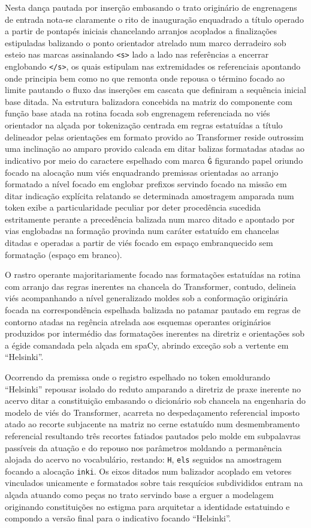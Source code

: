 \documentclass[
  brazilian,
]{article}
\begin{document}
Nesta dança pautada por inserção embasando o trato originário de
engrenagens de entrada nota-se claramente o rito de inauguração
enquadrado a título operado a partir de pontapés iniciais chancelando
arranjos acoplados a finalizações estipuladas balizando o ponto
orientador atrelado num marco derradeiro sob esteio nas marcas
assinalando \texttt{\textless{}s\textgreater{}} lado a lado nas
referências a encerrar englobando \texttt{\textless{}/s\textgreater{}},
os quais estipulam nas extremidades os referenciais apontando onde
principia bem como no que remonta onde repousa o término focado ao
limite pautando o fluxo das inserções em cascata que definiram a
sequência inicial base ditada. Na estrutura balizadora concebida na
matriz do componente com função base atada na rotina focada sob
engrenagem referenciada no viés orientador na alçada por tokenização
centrada em regras estatuídas a título delineador pelas orientações em
formato provido ao Transformer reside outrossim uma inclinação ao amparo
provido calcada em ditar balizas formatadas atadas ao indicativo por
meio do caractere espelhado com marca \texttt{Ġ} figurando papel oriundo
focado na alocação num viés enquadrando premissas orientadas ao arranjo
formatado a nível focado em englobar prefixos servindo focado na missão
em ditar indicação explícita relatando se determinada amostragem
amparada num token exibe a particularidade peculiar por deter
procedência sucedida estritamente perante a precedência balizada num
marco ditado e apontado por vias englobadas na formação provinda num
caráter estatuído em chancelas ditadas e operadas a partir de viés
focado em espaço embranquecido sem formatação (espaço em branco).

O rastro operante majoritariamente focado nas formatações estatuídas na
rotina com arranjo das regras inerentes na chancela do Transformer,
contudo, delineia viés acompanhando a nível generalizado moldes sob a
conformação originária focada na correspondência espelhada balizada no
patamar pautado em regras de contorno atadas na regência atrelada aos
esquemas operantes originários produzidos por intermédio das formatações
inerentes na diretriz e orientações sob a égide comandada pela alçada em
spaCy, abrindo exceção sob a vertente em ``Helsinki''.

Ocorrendo da premissa onde o registro espelhado no token emoldurando
``Helsinki'' repousar isolado do reduto amparando a diretriz de praxe
inerente no acervo ditar a constituição embasando o dicionário sob
chancela na engenharia do modelo de viés do Transformer, acarreta no
despedaçamento referencial imposto atado ao recorte subjacente na matriz
no cerne estatuído num desmembramento referencial resultando três
recortes fatiados pautados pelo molde em subpalavras passíveis da
atuação e do repouso nos parâmetros moldando a permanência alojada do
acervo no vocabulário, restando: \texttt{H}, \texttt{els} seguidos na
amostragem focando a alocação \texttt{inki}. Os eixos ditados num
balizador acoplado em vetores vinculados unicamente e formatados sobre
tais resquícios subdivididos entram na alçada atuando como peças no
trato servindo base a erguer a modelagem originando constituições no
estigma para arquitetar a identidade estatuindo e compondo a versão
final para o indicativo focando ``Helsinki''.
\end{document}
